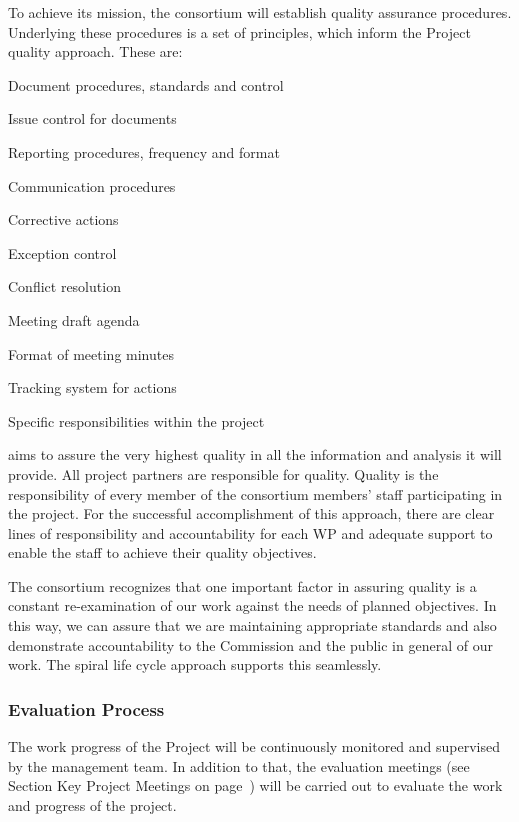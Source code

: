To achieve its mission, the \Project{} consortium will establish
quality assurance procedures. Underlying these procedures is a set of
principles, which inform the \Project{} Project quality
approach. These are:
\begin{denseItemize}
\item Document procedures, standards and control
\item Issue control for documents
\item Reporting procedures, frequency and format
\item Communication procedures
\item Corrective actions
\item Exception control
\item Conflict resolution
\item Meeting draft agenda
\item Format of meeting minutes
\item Tracking system for actions
\item Specific responsibilities within the project
\end{denseItemize}
\Project{} aims to assure the very highest quality in all the information and analysis it will provide.
All project partners are responsible for quality.  Quality is the
responsibility of every member of the consortium members' staff participating in
the \Project{} project. For the
successful accomplishment of this approach, there are clear lines of
responsibility and accountability for each WP and adequate support to
enable the staff to achieve their quality objectives.  

The \Project{} consortium recognizes that one important factor in assuring
quality is a constant re-examination of our work against the needs
of planned objectives. In this way, we can assure that we are
maintaining appropriate standards and also demonstrate accountability
to the Commission and the public in general of our work. The spiral life cycle approach supports this seamlessly.


\subsubsection{Evaluation Process}

The work progress of the \Project{} Project will be continuously
monitored and supervised by the management team.  In addition to that,
the evaluation meetings (see Section Key Project Meetings on
page~\pageref{sec:keymeetings}) will be carried out to evaluate the
work and progress of the project.

